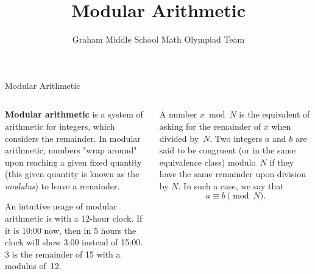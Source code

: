 \documentclass[9pt,aspectratio=169]{beamer}
\title{Modular Arithmetic}
\subtitle[Graham Middle School]{Graham Middle School Math Olympiad Team}
\begin{document}
\maketitle

\begin{frame}{Modular Arithmetic}
  \begin{columns}[T]
    \begin{column}{0.5\textwidth}
      \textbf{Modular arithmetic} is a system of arithmetic for integers, which considers the remainder. In modular arithmetic, numbers "wrap around" upon reaching a given fixed quantity (this given quantity is known as the \emph{modulus}) to leave a remainder.\medskip

      An intuitive usage of modular arithmetic is with a 12-hour clock. If it is 10:00 now, then in 5 hours the clock will show 3:00 instead of 15:00. 3 is the remainder of 15 with a modulus of~12.
    \end{column}
    \begin{column}{0.5\textwidth}
      A number $x\bmod N$ is the equivalent of asking for the remainder of $x$ when divided by~$N$. Two integers $a$ and $b$ are said to be congruent (or in the same equivalence class) modulo~$N$ if they have the same remainder upon division by $N$. In such a case, we say that \[a \equiv b\pmod N.\]
    \end{column}
  \end{columns}
\end{frame}
\end{document}
